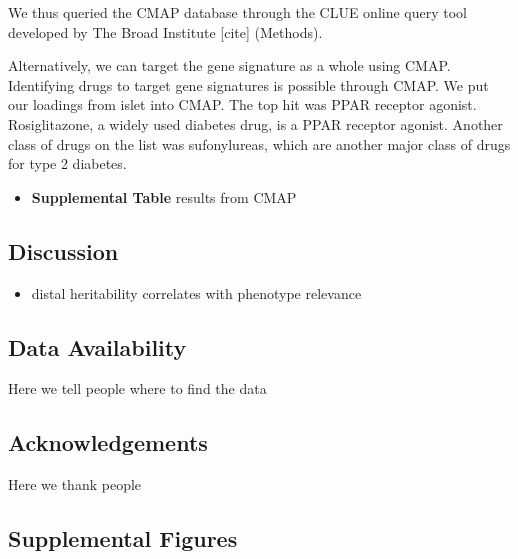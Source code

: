 \documentclass[
]{article}
\providecommand{\tightlist}{%
  \setlength{\itemsep}{0pt}\setlength{\parskip}{0pt}}
\begin{document}
We thus queried the CMAP database through the CLUE online query tool
developed by The Broad Institute {[}cite{]} (Methods).

Alternatively, we can target the gene signature as a whole using CMAP.
Identifying drugs to target gene signatures is possible through CMAP. We
put our loadings from islet into CMAP. The top hit was PPAR receptor
agonist. Rosiglitazone, a widely used diabetes drug, is a PPAR receptor
agonist. Another class of drugs on the list was sufonylureas, which are
another major class of drugs for type 2 diabetes.

\begin{itemize}
\tightlist
\item
  \textbf{Supplemental Table} results from CMAP
\end{itemize}

\subsection{Discussion}\label{discussion}

\begin{itemize}
\tightlist
\item
  distal heritability correlates with phenotype relevance
\end{itemize}

\subsection{Data Availability}\label{data-availability}

Here we tell people where to find the data

\subsection{Acknowledgements}\label{acknowledgements}

Here we thank people

\pagebreak

\subsection{Supplemental Figures}\label{supplemental-figures}
\end{document}

